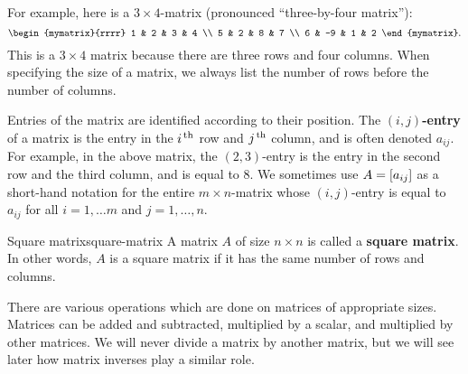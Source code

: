 For example, here is a $3\times 4$-matrix (pronounced ``three-by-four
matrix''):
\begin{equation*}
  \begin{mymatrix}{rrrr}
    1 & 2 & 3 & 4 \\
    5 & 2 & 8 & 7 \\
    6 & -9 & 1 & 2
  \end{mymatrix}.
\end{equation*}
This is a $3\times 4$ matrix because there are three rows and four
columns. When specifying the size of a matrix, we always list the
number of rows before the number of columns.

Entries of the matrix are identified according to their position. The
\textbf{$(i,j)$-entry}%
 of a matrix is
the entry in the $i^{\,\rm th}$ row and $j^{\,\rm th}$ column, and is often denoted
$a_{ij}$. For example, in the above matrix, the $(2,3)$-entry is the
entry in the second row and the third column, and is equal to $8$. We
sometimes use $A=\left[a_{ij}\right]$ as a short-hand notation for the entire
$m\times n$-matrix whose $(i,j)$-entry is equal to $a_{ij}$ for all
$i=1,\ldots m$ and $j=1,\ldots,n$.

\begin{definition}{Square matrix}{square-matrix}
  A matrix $A$ of size $n\times n$ is called a \textbf{square
    matrix}.  In other
  words, $A$ is a square matrix if it has the same number of rows and
  columns.
\end{definition}

There are various operations which are done on matrices of appropriate
sizes. Matrices can be added and subtracted, multiplied by a scalar,
and multiplied by other matrices. We will never divide a matrix by
another matrix, but we will see later how matrix inverses play a
similar role.

